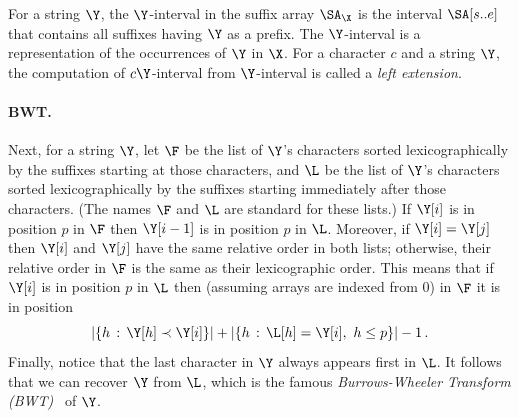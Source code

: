 

For a string $\Y$, the $\Y$-interval in the suffix array $\SA_{\X}$ is
the interval $\SA[s..e]$ that contains all suffixes having $\Y$ as a
prefix. The $\Y$-interval is a representation of the occurrences of
$\Y$ in $\X$. For a character $c$ and a string $\Y$, the computation
of $c\Y$-interval from $\Y$-interval is called a \emph{left extension}.

\paragraph*{BWT.} Next, for a string $\Y$, let $\F$ be the list of $\Y$'s characters sorted lexicographically by the suffixes starting at those characters, and $\L$ be the list of $\Y$'s characters sorted lexicographically by the suffixes starting immediately after those characters.  (The names $\F$ and $\L$ are standard for these lists.)  If \(\Y [i]\) is in position $p$ in $\F$ then \(\Y [i - 1]\) is in position $p$ in $\L$.  Moreover, if \(\Y [i] = \Y [j]\) then \(\Y [i]\) and \(\Y [j]\) have the same relative order in both lists; otherwise, their relative order in $\F$ is the same as their lexicographic order.  This means that if \(\Y [i]\) is in position $p$ in $\L$ then (assuming arrays are indexed from 0) in $\F$ it is in position
\[|\{h\,:\,\Y [h] \prec \Y[i]\}| + |\{h\,:\, \L [h] = \Y [i],\ h \leq p\}| - 1\,.\] Finally, notice that the last character in $\Y$ always appears first in $\L$.  It follows that we can recover $\Y$ from $\L$, which is the famous {\em Burrows-Wheeler Transform (BWT)}~\cite{bw1994} of $\Y$.



